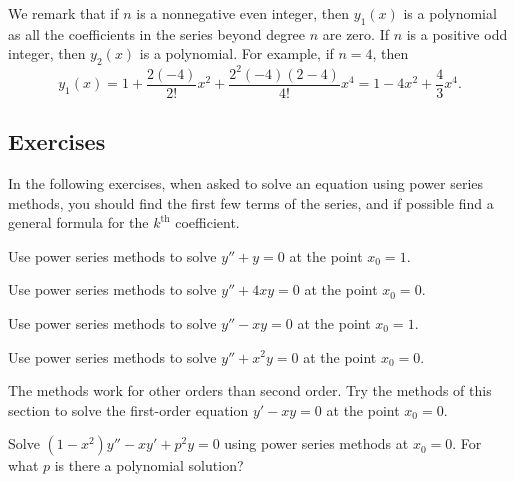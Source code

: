 \begin{example}
We remark that if $n$ is a nonnegative even integer, then $y_1(x)$ is a
polynomial as all the coefficients in the series beyond
degree $n$ are zero.  If $n$ is a positive odd integer, then $y_2(x)$ is
a polynomial.  For example, if $n=4$, then
\begin{equation*}
y_1(x) = 1 + \frac{2(-4)}{2!} x^2 + \frac{2^2(-4)(2-4)}{4!} x^4
= 1 - 4x^2 + \frac{4}{3} x^4 .
\end{equation*}
\end{example}

\subsection{Exercises}

In the following exercises, when asked to solve an equation using power
series methods, you should find the first few terms of the series,
and if possible find a general formula for the $k^{\text{th}}$ coefficient.

\begin{exercise}
Use power series methods to solve $y''+y = 0$ at the point $x_0 = 1$.
\end{exercise}

\begin{exercise}
Use power series methods to solve $y''+4xy = 0$ at the point $x_0 = 0$.
\end{exercise}

\begin{exercise}
Use power series methods to solve $y''-xy = 0$ at the point $x_0 = 1$.
\end{exercise}

\begin{exercise}
Use power series methods to solve $y''+x^2y = 0$ at the point $x_0 = 0$.
\end{exercise}

\begin{exercise}
The methods work for other orders than second order.  Try the methods
of this section to solve the first-order equation $y'-xy = 0$ at
the point $x_0 = 0$.
\end{exercise}

\begin{exercise}
\leavevmode
\begin{tasks}
\task Solve $(1-x^2)y''-xy' + p^2y = 0$ using power series methods at $x_0=0$.
\task For what $p$ is there a polynomial solution?
\end{tasks}
\end{exercise}

